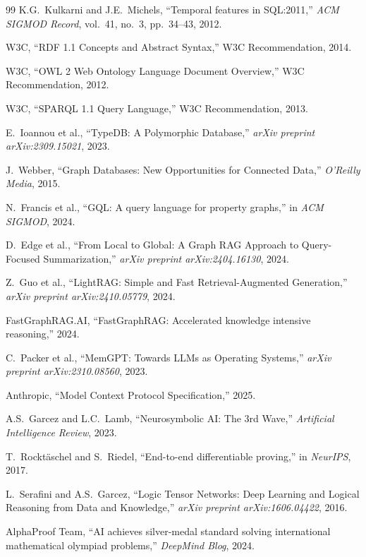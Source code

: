 \documentclass[11pt,a4paper]{article}
\begin{document}
\begin{thebibliography}{99}
 K.G.~Kulkarni and J.E.~Michels, ``Temporal features in
  SQL:2011,'' \emph{ACM SIGMOD Record}, vol.~41, no.~3, pp.~34--43, 2012.

 W3C, ``RDF 1.1 Concepts and Abstract Syntax,''
  W3C Recommendation, 2014.

 W3C, ``OWL 2 Web Ontology Language Document Overview,''
  W3C Recommendation, 2012.

 W3C, ``SPARQL 1.1 Query Language,''
  W3C Recommendation, 2013.

 E.~Ioannou et al., ``TypeDB: A Polymorphic Database,''
  \emph{arXiv preprint arXiv:2309.15021}, 2023.

 J.~Webber, ``Graph Databases: New Opportunities for Connected
  Data,'' \emph{O'Reilly Media}, 2015.

 N.~Francis et al., ``GQL: A query language for property
  graphs,'' in \emph{ACM SIGMOD}, 2024.

 D.~Edge et al., ``From Local to Global: A Graph RAG Approach
  to Query-Focused Summarization,''
  \emph{arXiv preprint arXiv:2404.16130}, 2024.

 Z.~Guo et al., ``LightRAG: Simple and Fast Retrieval-Augmented
  Generation,'' \emph{arXiv preprint arXiv:2410.05779}, 2024.

 FastGraphRAG.AI, ``FastGraphRAG: Accelerated knowledge
  intensive reasoning,'' 2024.

 C.~Packer et al., ``MemGPT: Towards LLMs as Operating
  Systems,'' \emph{arXiv preprint arXiv:2310.08560}, 2023.

 Anthropic, ``Model Context Protocol Specification,'' 2025.

 A.S.~Garcez and L.C.~Lamb, ``Neurosymbolic AI: The 3rd
  Wave,'' \emph{Artificial Intelligence Review}, 2023.

 T.~Rockt\"{a}schel and S.~Riedel, ``End-to-end differentiable
  proving,'' in \emph{NeurIPS}, 2017.

 L.~Serafini and A.S.~Garcez, ``Logic Tensor Networks: Deep
  Learning and Logical Reasoning from Data and Knowledge,''
  \emph{arXiv preprint arXiv:1606.04422}, 2016.

 AlphaProof Team, ``AI achieves silver-medal standard solving
  international mathematical olympiad problems,'' \emph{DeepMind Blog}, 2024.


\end{thebibliography}
\end{document}
